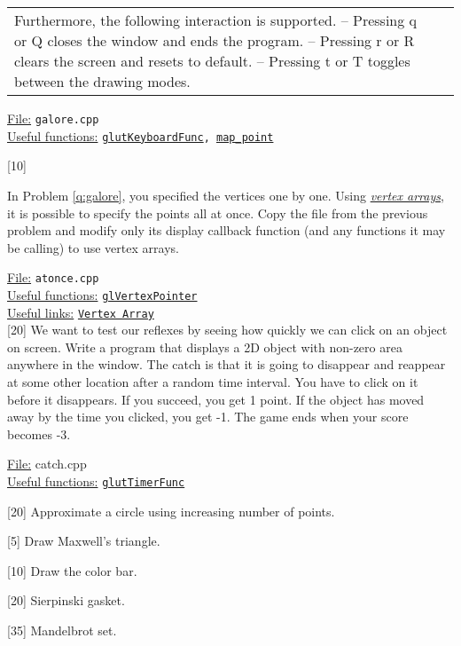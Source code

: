 \documentclass[addpoints]{exam}
\begin{document}
\begin{questions}
\begin{tabularx}{\linewidth}{lX}
    Furthermore, the following interaction is supported.\newline
    -- Pressing q or Q closes the window and ends the program.\newline
    -- Pressing r or R clears the screen and resets to default.\newline
    -- Pressing t or T toggles between the drawing modes.
  \end{tabularx}
  \underline{File:} {\tt galore.cpp}\\
  \underline{Useful functions:} {\tt \href{https://www.opengl.org/resources/libraries/glut/spec3/node49.html#SECTION00084000000000000000}{glutKeyboardFunc}, \hyperref[q:galore]{map\_point}}

  [10]

  In Problem \ref{q:galore}, you specified the vertices one by one. Using \href{http://www.informit.com/articles/article.aspx?p=1377833&seqNum=6}{\it vertex arrays}, it is possible to specify the points all at once. Copy the file from the previous problem and modify only its display callback function (and any functions it may be calling) to use vertex arrays.
  
  \noindent\underline{File:} {\tt atonce.cpp}\\
  \underline{Useful functions:} {\tt \href{https://www.khronos.org/registry/OpenGL-Refpages/gl2.1/xhtml/glVertexPointer.xml}{glVertexPointer}}\\
  \underline{Useful links:} {\tt \href{http://www.songho.ca/opengl/gl_vertexarray.html}{Vertex Array}}\\
  
  [20]
  We want to test our reflexes by seeing how quickly we can click on an object on screen. Write a program that displays a 2D object with non-zero area anywhere in the window. The catch is that it is going to disappear and reappear at some other location after a random time interval. You have to click on it before it disappears. If you succeed, you get 1 point. If the object has moved away by the time you clicked, you get -1. The game ends when your score becomes -3.

  \noindent\underline{File:} {catch.cpp}\\
  \underline{Useful functions:} {\tt \href{https://www.opengl.org/resources/libraries/glut/spec3/node64.html#SECTION000819000000000000000}{glutTimerFunc}}


  [20]
  Approximate a circle using increasing number of points.

  [5]
  Draw Maxwell's triangle.

  [10]
  Draw the color bar.

  [20]
  Sierpinski gasket.

  [35]
  Mandelbrot set.


  
  
\end{questions}
\end{document}
